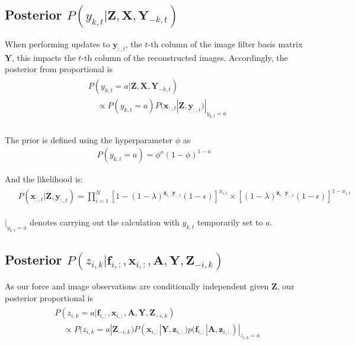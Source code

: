 \documentclass[]{article}
\begin{document}
\subsection{Posterior $P(y_{k,t}|\mathbf{Z}, \mathbf{X}, \mathbf{Y}_{-k,t})$}
When performing updates to $\mathbf{y}_{:,t}$, the $t$-th column of the image filter basis matrix $\mathbf{Y}$, this impacts the $t$-th column of the reconstructed images. Accordingly, the posterior from proportional is
\begin{align}
	\begin{split}\label{eq:posterior_Ykt}
		&P(y_{k,t}=a|\mathbf{Z}, \mathbf{X}, \mathbf{Y}_{-k,t}) \\
		&\quad \propto P(y_{k,t}=a) P(\mathbf{x}_{:,t}|\mathbf{Z}, \mathbf{y}_{:,t})|_{y_{k,t}=a} \\
	\end{split}
\end{align}

The prior is defined using the hyperparameter $\phi$ as 
\begin{align}
	P(y_{k,t}=a) = \phi^a (1-\phi)^{1-a}
\end{align}

And the likelihood is:
\begin{align}
	\begin{split}\label{eq:lik_pxt}
		&P(\mathbf{x}_{:,t}|\mathbf{Z}, \mathbf{y}_{:,t}) =\prod_{i=1}^{N} \left[1 - (1-\lambda)^{\mathbf{z}_{i,:}\mathbf{y}_{:,t}}(1-\epsilon)\right]^{x_{i,t}} \times \left[ (1-\lambda)^{\mathbf{z}_{i,:}\mathbf{y}_{:,t}}(1-\epsilon)\right]^{1 - x_{i,t}} 
	\end{split}
\end{align}

 $|_{y_{k,t}=a}$ denotes carrying out the calculation with $y_{k,t}$ temporarily set to $a$.

\subsection{Posterior $P(z_{i,k}|\mathbf{f}_{i,:}, \mathbf{x}_{i,:}, \mathbf{A}, \mathbf{Y}, \mathbf{Z}_{-i,k})$}
As our force and image observations are conditionally independent given $\mathbf{Z}$, our posterior proportional is
	\begin{align}
		\begin{split}\label{eq:posterior_Zik}
			&P(z_{i,k}=a|\mathbf{f}_{i,:}, \mathbf{x}_{i,:}, \mathbf{A}, \mathbf{Y}, \mathbf{Z}_{-i,k}) \\
			&\quad \propto P(z_{i,k}=a| \mathbf{Z}_{-i,k}) P(\mathbf{x}_{i,:}|\mathbf{Y}, \mathbf{z}_{i,:})  p(\mathbf{f}_{i,:}|\mathbf{A}, \mathbf{z}_{i,:})|_{z_{i,k}=a} 
		\end{split}
	\end{align}
\end{document}
